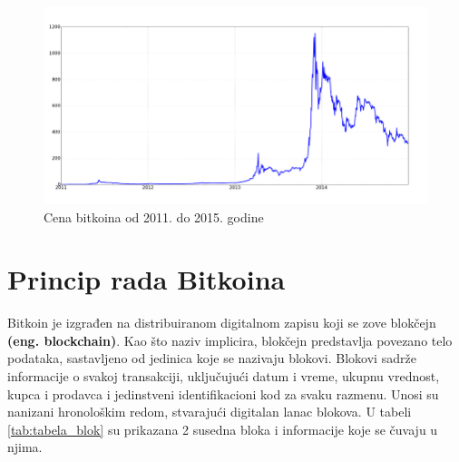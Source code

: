 \documentclass[a4paper]{article}
\begin{document}
\begin{figure}[h!]
	\begin{center}
		\includegraphics[scale=0.4]{chart.png}
	\end{center}
	\caption{Cena bitkoina od 2011. do 2015. godine}
	\label{fig:grafikon}
\end{figure}

\section{Princip rada Bitkoina}
\label{sec:princip_rada}

Bitkoin je izgrađen na distribuiranom digitalnom zapisu koji se zove blokčejn \textbf{(eng. blockchain)}. Kao što naziv implicira, blokčejn predstavlja povezano telo podataka, sastavljeno od jedinica koje se nazivaju blokovi. Blokovi sadrže informacije o svakoj transakciji, uključujući datum i vreme, ukupnu vrednost, kupca i prodavca i jedinstveni identifikacioni kod za svaku razmenu. Unosi su nanizani hronološkim redom, stvarajući digitalan lanac blokova.\cite{princip_rada} U tabeli \ref{tab:tabela_blok} su prikazana 2 susedna bloka i informacije koje se čuvaju u njima.

\begin{table}[h!]

\begin{center}
\caption{Struktura blokova u blokčejnu.}

\captionsetup[subfloat]{labelformat=empty}
\quad
{}
\quad
{}

\label{tab:tabela_blok}
\end{center}
\end{table}
\end{document}
